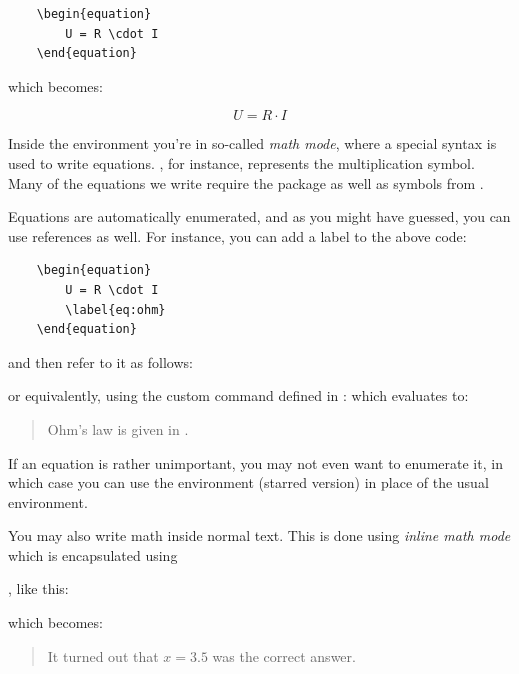 {
\begin{verbatim}
	\begin{equation}
		U = R \cdot I		
	\end{equation}
\end{verbatim}
which becomes:

\begin{equation}
	U = R \cdot I
	\label{eq:latex:ohm}
\end{equation}

Inside the  environment you're in so-called \emph{math mode}, where a special syntax is used to write equations. \latexin{\cdot}, for instance, represents the multiplication symbol. Many of the equations we write require the package  as well as symbols from . 

Equations are automatically enumerated, and as you might have guessed, you can use references as well. For instance, you can add a label to the above code:
\begin{verbatim}
	\begin{equation}
		U = R \cdot I
		\label{eq:ohm}		
	\end{equation}
\end{verbatim}
and then refer to it as follows:

\noindent or equivalently, using the custom  command defined in :
\noindent which evaluates to:

\begin{quote}
	Ohm's law is given in .
\end{quote}

If an equation is rather unimportant, you may not even want to enumerate it, in which case you can use the  environment (starred version) in place of the usual  environment.

You may also write math inside normal text. This is done using \emph{inline math mode} which is encapsulated using \latexin{$}\ignore{$}, like this:

\noindent which becomes:

\begin{quote}
	It turned out that $x=3.5$ was the correct answer.
\end{quote}

}
